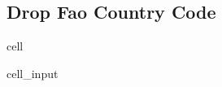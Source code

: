 \documentclass[letterpaper,10pt,english]{jupyterBook}
\begin{document}
\subsection{Drop Fao Country Code}
\label{\detokenize{notebooks/data_exploration:drop-fao-country-code}}
\begin{sphinxuseclass}{cell}\begin{sphinxVerbatimInput}

\begin{sphinxuseclass}{cell_input}
\begin{sphinxVerbatim}[commandchars=\\\{\}]
  \PYG{p}{[}\PYG{p}{]}  
\end{sphinxVerbatim}

\end{sphinxuseclass}\end{sphinxVerbatimInput}
\begin{sphinxVerbatimOutput}


\end{sphinxVerbatimOutput}
\end{sphinxuseclass}
\end{document}
